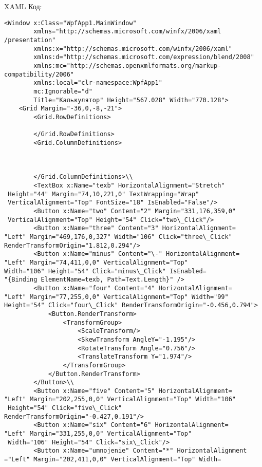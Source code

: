 XAML Код:
\begin{verbatim}
<Window x:Class="WpfApp1.MainWindow"
        xmlns="http://schemas.microsoft.com/winfx/2006/xaml
/presentation"
        xmlns:x="http://schemas.microsoft.com/winfx/2006/xaml"
        xmlns:d="http://schemas.microsoft.com/expression/blend/2008"
        xmlns:mc="http://schemas.openxmlformats.org/markup-
compatibility/2006"
        xmlns:local="clr-namespace:WpfApp1"
        mc:Ignorable="d"
        Title="Калькулятор" Height="567.028" Width="770.128">
    <Grid Margin="-36,0,-8,-21">
        <Grid.RowDefinitions>

        </Grid.RowDefinitions>
        <Grid.ColumnDefinitions>



        </Grid.ColumnDefinitions>\\
        <TextBox x:Name="texb" HorizontalAlignment="Stretch"
 Height="44" Margin="74,10,221,0" TextWrapping="Wrap"
 VerticalAlignment="Top" FontSize="18" IsEnabled="False"/>
        <Button x:Name="two" Content="2" Margin="331,176,359,0"
 VerticalAlignment="Top" Height="54" Click="two\_Click"/>
        <Button x:Name="three" Content="3" HorizontalAlignment=
"Left" Margin="469,176,0,327" Width="106" Click="three\_Click" 
RenderTransformOrigin="1.812,0.294"/>
        <Button x:Name="minus" Content="\-" HorizontalAlignment=
"Left" Margin="74,411,0,0" VerticalAlignment="Top" 
Width="106" Height="54" Click="minus\_Click" IsEnabled=
"{Binding ElementName=texb, Path=Text.Length}" />
        <Button x:Name="four" Content="4" HorizontalAlignment=
"Left" Margin="77,255,0,0" VerticalAlignment="Top" Width="99" 
Height="54" Click="four\_Click" RenderTransformOrigin="-0.456,0.794">
            <Button.RenderTransform>
                <TransformGroup>
                    <ScaleTransform/>
                    <SkewTransform AngleY="-1.195"/>
                    <RotateTransform Angle="0.756"/>
                    <TranslateTransform Y="1.974"/>
                </TransformGroup>
            </Button.RenderTransform>
        </Button>\\
        <Button x:Name="five" Content="5" HorizontalAlignment=
"Left" Margin="202,255,0,0" VerticalAlignment="Top" Width="106"
 Height="54" Click="five\_Click" RenderTransformOrigin="-0.427,0.191"/>
        <Button x:Name="six" Content="6" HorizontalAlignment=
"Left" Margin="331,255,0,0" VerticalAlignment="Top"
 Width="106" Height="54" Click="six\_Click"/>
        <Button x:Name="umnojenie" Content="*" HorizontalAlignment
="Left" Margin="202,411,0,0" VerticalAlignment="Top" Width=

\end{verbatim}
